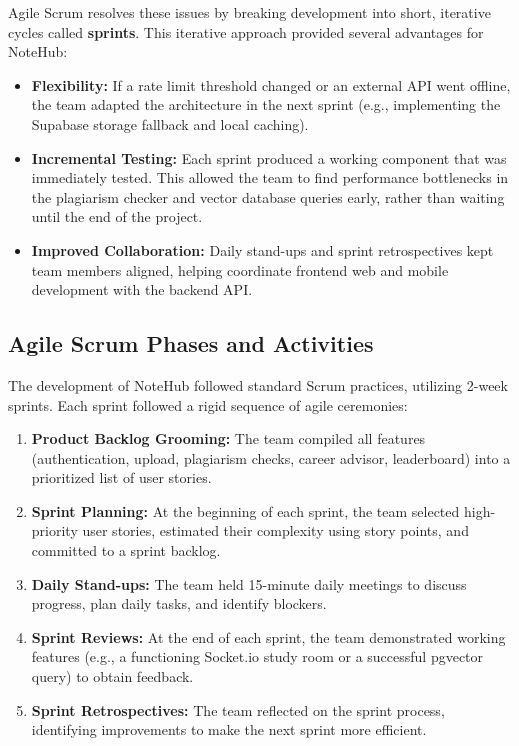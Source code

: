 \documentclass[12,Times new Roman,a4paper]{report}
\begin{document}
Agile Scrum resolves these issues by breaking development into short, iterative cycles called \textbf{sprints}. This iterative approach provided several advantages for NoteHub:
\begin{itemize}
    \item \textbf{Flexibility:} If a rate limit threshold changed or an external API went offline, the team adapted the architecture in the next sprint (e.g., implementing the Supabase storage fallback and local caching).
    \item \textbf{Incremental Testing:} Each sprint produced a working component that was immediately tested. This allowed the team to find performance bottlenecks in the plagiarism checker and vector database queries early, rather than waiting until the end of the project.
    \item \textbf{Improved Collaboration:} Daily stand-ups and sprint retrospectives kept team members aligned, helping coordinate frontend web and mobile development with the backend API.
\end{itemize}

\subsection{Agile Scrum Phases and Activities}
The development of NoteHub followed standard Scrum practices, utilizing 2-week sprints. Each sprint followed a rigid sequence of agile ceremonies:
\begin{enumerate}
    \item \textbf{Product Backlog Grooming:} The team compiled all features (authentication, upload, plagiarism checks, career advisor, leaderboard) into a prioritized list of user stories.
    \item \textbf{Sprint Planning:} At the beginning of each sprint, the team selected high-priority user stories, estimated their complexity using story points, and committed to a sprint backlog.
    \item \textbf{Daily Stand-ups:} The team held 15-minute daily meetings to discuss progress, plan daily tasks, and identify blockers.
    \item \textbf{Sprint Reviews:} At the end of each sprint, the team demonstrated working features (e.g., a functioning Socket.io study room or a successful pgvector query) to obtain feedback.
    \item \textbf{Sprint Retrospectives:} The team reflected on the sprint process, identifying improvements to make the next sprint more efficient.
\end{enumerate}
\end{document}
